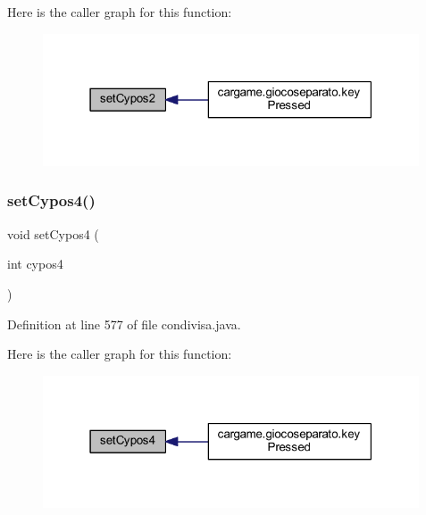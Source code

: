 Here is the caller graph for this function\+:
\nopagebreak
\begin{figure}[H]
\begin{center}
\leavevmode
\includegraphics[width=316pt]{classcargame_1_1condivisa_acdb37b1eabbd63bf181251992fddbcfe_icgraph}
\end{center}
\end{figure}
\mbox{\label{classcargame_1_1condivisa_a33402e14739516b3f92c8aa29206b288}} 
\subsubsection{\texorpdfstring{set\+Cypos4()}{setCypos4()}}
{\footnotesize\ttfamily void set\+Cypos4 (\begin{DoxyParamCaption}\item[{int}]{cypos4 }\end{DoxyParamCaption})}



Definition at line 577 of file condivisa.\+java.

Here is the caller graph for this function\+:
\nopagebreak
\begin{figure}[H]
\begin{center}
\leavevmode
\includegraphics[width=316pt]{classcargame_1_1condivisa_a33402e14739516b3f92c8aa29206b288_icgraph}
\end{center}
\end{figure}
\mbox{\label{classcargame_1_1condivisa_ae1e077b4b6da22211fc4e93d5806a095}} 
